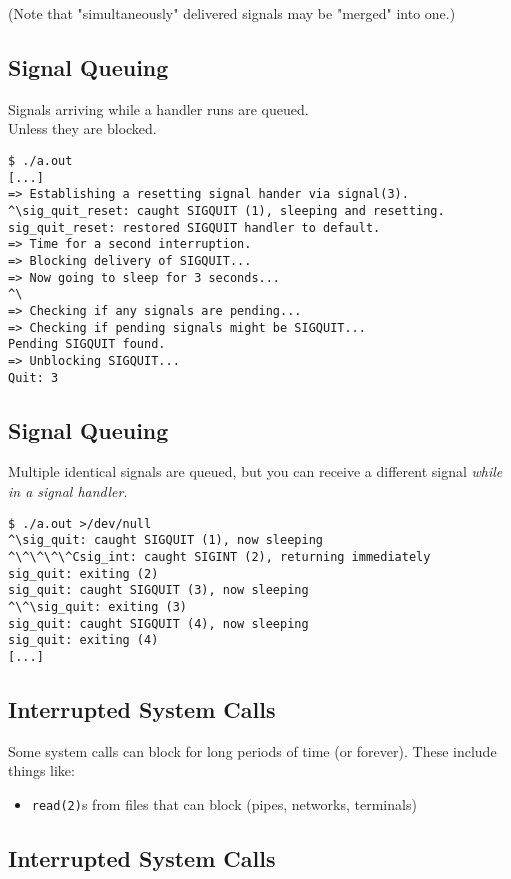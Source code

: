 \documentclass[xga]{xdvislides}
\begin{document}
(Note that "simultaneously" delivered signals may be "merged" into one.)

\subsection{Signal Queuing}
Signals arriving while a handler runs are queued. \\
Unless they are blocked.

\begin{verbatim}
$ ./a.out
[...]
=> Establishing a resetting signal hander via signal(3).
^\sig_quit_reset: caught SIGQUIT (1), sleeping and resetting.
sig_quit_reset: restored SIGQUIT handler to default.
=> Time for a second interruption.
=> Blocking delivery of SIGQUIT...
=> Now going to sleep for 3 seconds...
^\
=> Checking if any signals are pending...
=> Checking if pending signals might be SIGQUIT...
Pending SIGQUIT found.
=> Unblocking SIGQUIT...
Quit: 3
\end{verbatim}


\subsection{Signal Queuing}
Multiple identical signals are queued, but you can receive a different
signal {\em while in a signal handler}.
\begin{verbatim}
$ ./a.out >/dev/null
^\sig_quit: caught SIGQUIT (1), now sleeping
^\^\^\^\^Csig_int: caught SIGINT (2), returning immediately
sig_quit: exiting (2)
sig_quit: caught SIGQUIT (3), now sleeping
^\^\sig_quit: exiting (3)
sig_quit: caught SIGQUIT (4), now sleeping
sig_quit: exiting (4)
[...]
\end{verbatim}

\subsection{Interrupted System Calls}

Some system calls can block for long periods of time (or forever). These
include things like:

\begin{itemize}
	\item {\tt read(2)}s from files that can block (pipes, networks, terminals)
\end{itemize}

\subsection{Interrupted System Calls}
\end{document}
